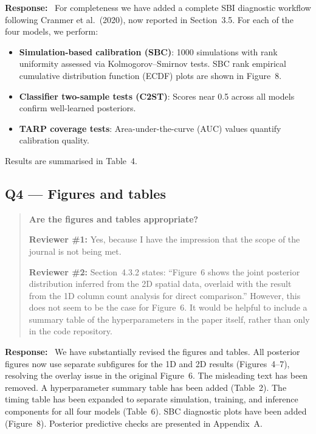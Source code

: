 \documentclass[11pt,a4paper]{article}
\newenvironment{reviewercomment}{%
  \begin{quote}\itshape\color{reviewerblue}%
}{%
  \end{quote}%
}
\newcommand{\response}{\textbf{Response:}~}
\begin{document}
\response
For completeness we have added a complete SBI diagnostic workflow following Cranmer et al.\ (2020), now reported in Section~3.5. For each of the four models, we perform:
\begin{itemize}[nosep]
  \item \textbf{Simulation-based calibration (SBC)}: 1000 simulations with rank uniformity assessed via Kolmogorov--Smirnov tests. SBC rank empirical cumulative distribution function (ECDF) plots are shown in Figure~8.
  \item \textbf{Classifier two-sample tests (C2ST)}: Scores near 0.5 across all models confirm well-learned posteriors.
  \item \textbf{TARP coverage tests}: Area-under-the-curve (AUC) values quantify calibration quality.
\end{itemize}
Results are summarised in Table~4.


\subsection*{Q4 --- Figures and tables}

\begin{reviewercomment}
\textbf{Are the figures and tables appropriate?}

\textbf{Reviewer \#1:} Yes, because I have the impression that the scope of the journal is not being met.

\textbf{Reviewer \#2:} Section~4.3.2 states: ``Figure~6 shows the joint posterior distribution inferred from the 2D spatial data, overlaid with the result from the 1D column count analysis for direct comparison.'' However, this does not seem to be the case for Figure~6. It would be helpful to include a summary table of the hyperparameters in the paper itself, rather than only in the code repository.
\end{reviewercomment}

\response
We have substantially revised the figures and tables. All posterior figures now use separate subfigures for the 1D and 2D results (Figures~4--7), resolving the overlay issue in the original Figure~6. The misleading text has been removed. A hyperparameter summary table has been added (Table~2). The timing table has been expanded to separate simulation, training, and inference components for all four models (Table~6). SBC diagnostic plots have been added (Figure~8). Posterior predictive checks are presented in Appendix~A.


\end{document}
